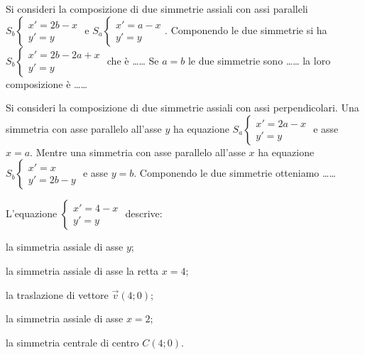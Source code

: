 \begin{esercizio}
	\label{ese:8.80} %
	Si consideri la composizione di due simmetrie assiali con assi 
	paralleli $S_b\begin{cases}x'=2b-x\\y'=y\end{cases}$ e 
	$S_a\begin{cases}x'=a-x\\y'=y\end{cases}$.
	Componendo le due simmetrie si ha 
	$S_b\begin{cases}x'=2b-2a+x\\y'=y\end{cases}$ che è \ldots\ldots{}
	Se $a=b$ le due simmetrie sono \ldots\ldots{} la loro composizione è 
	\ldots\dots{}
\end{esercizio}

\begin{esercizio}
	\label{ese:8.81} %
	Si consideri la composizione di due simmetrie assiali con assi 
	perpendicolari.
	Una simmetria con asse parallelo all'asse $y$ ha equazione 
	$S_a\begin{cases}x'=2a-x\\y'=y\end{cases}$ e asse $x = a$.
	Mentre una simmetria con asse parallelo all'asse $x$ ha equazione 
	$S_b\begin{cases}x'=x\\y'=2b-y\end{cases}$ e asse $y = b$.
	Componendo le due simmetrie otteniamo \ldots\ldots{}
\end{esercizio}

\begin{esercizio}
	\label{ese:8.87} %
	L'equazione $\begin{cases}x'=4-x\\y'=y\end{cases}$ descrive: 
	\begin{enumeratea}
		\item la simmetria assiale di asse $y$;
		\item la simmetria assiale di asse la retta $x=4$;
		\item la traslazione di vettore $\vec{v}(4;0)$;
		\item la simmetria assiale di asse $x=2$;
		\item la simmetria centrale di centro $C(4;0)$.
	\end{enumeratea}
\end{esercizio}

